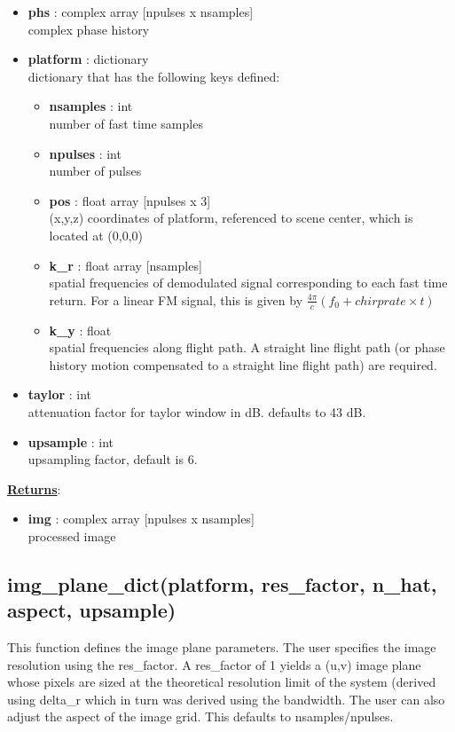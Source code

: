 \documentclass{article}
\newcommand{\defs}[2]{\textbf{{#1}} : {#2}}
\begin{document}
\begin{itemize}
	\item \defs{phs}{complex array [npulses x nsamples]}\\
  	complex phase history
  	\item \defs{platform}{dictionary}\\
  	dictionary that has the following keys defined:
	\begin{itemize}
    	\item \defs{nsamples}{int}\\
    		number of fast time samples
	    \item \defs{npulses}{int}\\
	    	number of pulses
	    \item \defs{pos}{float array [npulses x 3]}\\
	       	(x,y,z) coordinates of platform, referenced to scene center, which is located at (0,0,0)
	    \item\defs{k\_r}{float array [nsamples]}\\
	    	spatial frequencies of demodulated signal corresponding to each fast time return.  For a linear FM signal, this is given by $\frac{4\pi}{c}(f_0+chirprate\times t)$
	    \item\defs{k\_y}{float}\\
	    	spatial frequencies along flight path.  A straight line flight path (or phase history motion compensated to a straight line flight path) are required.
	\end{itemize}
	\item\defs{taylor}{int}\\
	attenuation factor for taylor window in dB.  defaults to 43 dB.
	\item\defs{upsample}{int}\\
	upsampling factor, default is 6.
\end{itemize}

\noindent \underline{\textbf{Returns}}:
\begin{itemize}
	\item \defs{img}{complex array [npulses x nsamples]}\\
	processed image
\end{itemize} 

\newpage

\subsection{img\_plane\_dict(platform, res\_factor, n\_hat, aspect, upsample)}
This function defines the image plane parameters.  The user specifies the image resolution using the res\_factor.  A res\_factor of 1 yields a (u,v) image plane whose pixels are sized at the theoretical resolution limit of the system (derived using delta\_r which in turn was derived using the bandwidth.  The user can also adjust the aspect of the image grid.  This defaults to nsamples/npulses.
\end{document}
